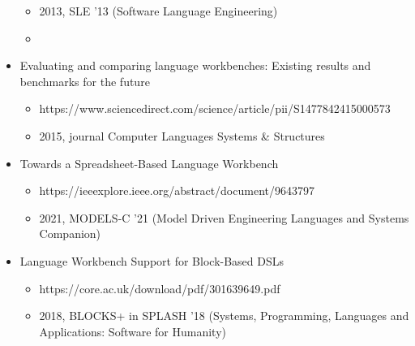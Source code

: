 \begin{itemize}
\begin{itemize}
        \item 2013, SLE '13 (Software Language Engineering)
        \item 
      \end{itemize}
      \item Evaluating and comparing language workbenches: Existing results and benchmarks for the future
      \begin{itemize}
        \item https://www.sciencedirect.com/science/article/pii/S1477842415000573
        \item 2015, journal Computer Languages Systems \& Structures
      \end{itemize}
      \item Towards a Spreadsheet-Based Language Workbench
      \begin{itemize}
        \item https://ieeexplore.ieee.org/abstract/document/9643797
        \item 2021, MODELS-C '21 (Model Driven Engineering Languages and Systems Companion)
      \end{itemize}
      \item Language Workbench Support for Block-Based DSLs
      \begin{itemize}
        \item https://core.ac.uk/download/pdf/301639649.pdf
        \item 2018, BLOCKS+ in SPLASH '18 (Systems, Programming, Languages and Applications: Software for Humanity)
      \end{itemize}
    \end{itemize}